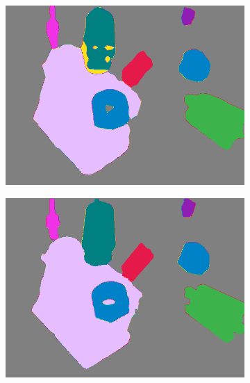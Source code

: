 \begin{figure}[h]
\begin{subfigure}{.24\textwidth}
			\includegraphics[width=1\linewidth]{images/sample_predictions/00132_mob_size_pred}
		\end{subfigure}
		\begin{subfigure}{.24\textwidth}
			\centering
			\includegraphics[width=1\linewidth]{images/sample_predictions/00132_xcep_size_pred}
		\end{subfigure}
		\begin{subfigure}{.24\textwidth}
			\centering

\end{subfigure}
\end{figure}
